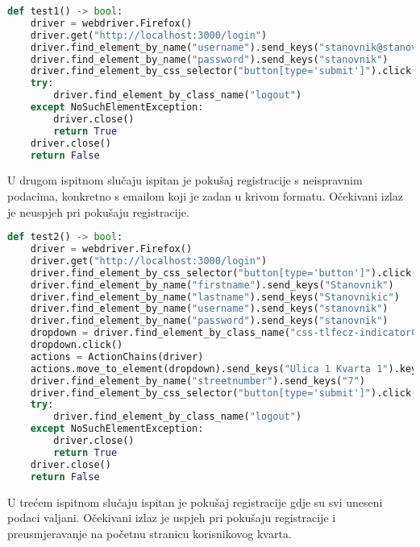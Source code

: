 			\begin{lstlisting}[language=Python, breaklines=true]
def test1() -> bool:
    driver = webdriver.Firefox()
    driver.get("http://localhost:3000/login")
    driver.find_element_by_name("username").send_keys("stanovnik@stanovnik.com")
    driver.find_element_by_name("password").send_keys("stanovnik")
    driver.find_element_by_css_selector("button[type='submit']").click()
    try:
        driver.find_element_by_class_name("logout")
    except NoSuchElementException:
        driver.close()
        return True
    driver.close()
    return False		
			\end{lstlisting}

			U drugom ispitnom slučaju ispitan je pokušaj registracije s neispravnim podacima, konkretno s emailom koji je zadan u krivom formatu. Očekivani izlaz je neuspjeh pri pokušaju registracije.
		
			\begin{lstlisting}[language=Python, breaklines=true]
def test2() -> bool:
    driver = webdriver.Firefox()
    driver.get("http://localhost:3000/login")
    driver.find_element_by_css_selector("button[type='button']").click()
    driver.find_element_by_name("firstname").send_keys("Stanovnik")
    driver.find_element_by_name("lastname").send_keys("Stanovnikic")
    driver.find_element_by_name("username").send_keys("stanovnik")
    driver.find_element_by_name("password").send_keys("stanovnik")
    dropdown = driver.find_element_by_class_name("css-tlfecz-indicatorContainer")
    dropdown.click()
    actions = ActionChains(driver)
    actions.move_to_element(dropdown).send_keys("Ulica 1 Kvarta 1").key_down(Keys.ENTER).key_up(Keys.ENTER).perform()
    driver.find_element_by_name("streetnumber").send_keys("7")
    driver.find_element_by_css_selector("button[type='submit']").click()
    try:
        driver.find_element_by_class_name("logout")
    except NoSuchElementException:
        driver.close()
        return True
    driver.close()
    return False
			\end{lstlisting}
			
			U trećem ispitnom slučaju ispitan je pokušaj registracije gdje su svi uneseni podaci valjani. Očekivani izlaz je uspjeh pri pokušaju registracije i preusmjeravanje na početnu stranicu korisnikovog kvarta.
			
